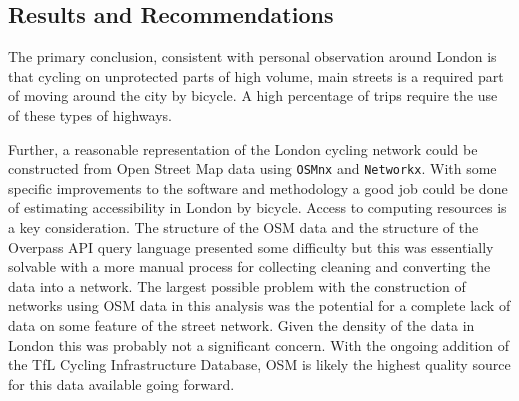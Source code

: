 

%


\subsection{Results and Recommendations}	

The primary conclusion, consistent with personal observation around London is that cycling on unprotected parts of high volume, main streets is a required part of moving around the city by bicycle. A high percentage of trips require the use of these types of highways. 

Further, a reasonable representation of the London cycling network could be constructed from Open Street Map data using \texttt{OSMnx} and \texttt{Networkx}. With some specific improvements to the software and methodology a good job could be done of estimating accessibility in London by bicycle. Access to computing resources is a key consideration. The structure of the OSM data and the structure of the Overpass API query language presented some difficulty but this was essentially solvable with a more manual process for collecting cleaning and converting the data into a network. The largest possible problem with the construction of networks using OSM data in this analysis was the potential for a complete lack of data on some feature of the street network. Given the density of the data in London this was probably not a significant concern. With the ongoing addition of the TfL Cycling Infrastructure Database, OSM is likely the highest quality source for this data available going forward. 

